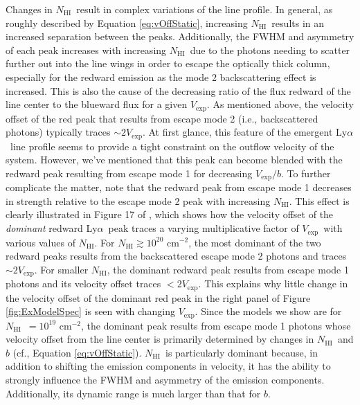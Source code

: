 \documentclass{emulateapj}
\newcommand{\lya}{Ly$\alpha$}
\def\nh{$N_{\mathrm{HI}}$}
\def\vexp{$V_{\mathrm{exp}}$}
\begin{document}
Changes in \nh\ result in complex variations of the line profile. In general, as roughly described by Equation \ref{eq:vOffStatic}, increasing \nh\ results in an increased separation between the peaks. Additionally, the FWHM and asymmetry of each peak increases with increasing \nh\ due to the photons needing to scatter further out into the line wings in order to escape the optically thick column, especially for the redward emission as the mode 2 backscattering effect is increased. This is also the cause of the decreasing ratio of the flux redward of the line center to the blueward flux for a given \vexp. As mentioned above, the velocity offset of the red peak that results from escape mode 2 (i.e., backscattered photons) typically traces $\sim2 V_{\mathrm{exp}}$. At first glance, this feature of the emergent \lya\ line profile seems to provide a tight constraint on the outflow velocity of the system. However, we've mentioned that this peak can become blended with the redward peak resulting from escape mode 1 for decreasing $V_{\mathrm{exp}} / b$. To further complicate the matter, \citet{verhamme2006} note that the redward peak from escape mode 1 decreases in strength relative to the escape mode 2 peak with increasing \nh. This effect is clearly illustrated in Figure 17 of \citet{verhamme2008}, which shows how the velocity offset of the \textit{dominant} redward \lya\ peak traces a varying multiplicative factor of \vexp\ with various values of \nh. For $N_{\mathrm{HI}} \gtrsim 10^{20}$ cm$^{-2}$, the most dominant of the two redward peaks results from the backscattered escape mode 2 photons and traces $\sim2 V_{\mathrm{exp}}$. For smaller \nh, the dominant redward peak results from escape mode 1 photons and its velocity offset traces $<2 V_{\mathrm{exp}}$. This explains why little change in the velocity offset of the dominant red peak in the right panel of Figure \ref{fig:ExModelSpec} is seen with changing \vexp. Since the models we show are for \nh\ $= 10^{19}$ cm$^{-2}$, the dominant peak results from escape mode 1 photons whose velocity offset from the line center is primarily determined by changes in \nh\ and $b$ (cf., Equation \ref{eq:vOffStatic}). \nh\ is particularly dominant because, in addition to shifting the emission components in velocity, it has the ability to strongly influence the FWHM and asymmetry of the emission components. Additionally, its dynamic range is much larger than that for $b$. 
\end{document}
